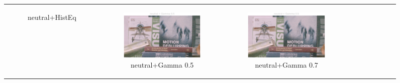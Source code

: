 \documentclass[11pt, a4]{article}
\begin{document}
\begin{enumerate}
\begin{enumerate}
\begin{figure}[h]
{\begin{tabular}{cccc}
\begin{subfigure}[h]{0.45\linewidth}
							\caption{neutral+HistEq}
							\label{fig:RawImage1_tone_9}
						\end{subfigure} &
						\begin{subfigure}[h]{0.45\linewidth}
							\centering
							\includegraphics[width=\linewidth]{../output/RawImage1_Tone_neutral_Gamma0.5.pdf}
							\caption{neutral+Gamma 0.5}
							\label{fig:RawImage1_tone_10}
						\end{subfigure} &
						\begin{subfigure}[h]{0.45\linewidth}
							\centering
							\includegraphics[width=\linewidth]{../output/RawImage1_Tone_neutral_Gamma0.5.pdf}
							\caption{neutral+Gamma 0.7}
							\label{fig:RawImage1_tone_11}
						\end{subfigure} &
						\begin{subfigure}[h]{0.45\linewidth}
							\centering

\end{subfigure}
\end{tabular}}
\end{figure}
\end{enumerate}
\end{enumerate}
\end{document}

